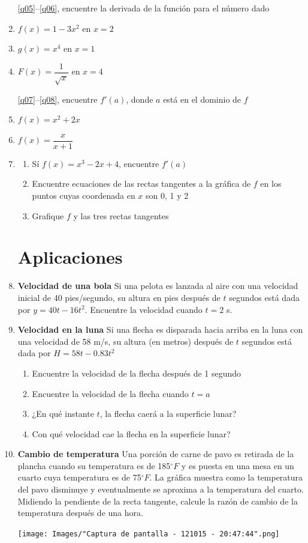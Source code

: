 \documentclass[letterpaper,twoside]{article}
\begin{document}
\begin{multicols}{2}
\begin{enumerate}
\ref{q05}--\ref{q06}, encuentre la derivada de la función para el número dado
\item \label{q05} $f(x)=1-3x^{2}$ en $x=2$
\item $g(x)=x^{4}$ en $x=1$
\item \label{q06} $F(x)=\dfrac{1}{\sqrt{x}}$ en $x=4$

\ref{q07}--\ref{q08}, encuentre $f'(a)$, donde $a$ está en el dominio de $f$
\item \label{q07} $f(x)=x^{2}+2x$
\item $f(x)=\dfrac{x}{x+1}$
\item \label{q08} \begin{enumerate}
\item Sí $f(x)=x^{3}-2x+4$, encuentre $f'(a)$
\item Encuentre ecuaciones de las rectas tangentes a la gráfica de $f$ en los puntos cuyas coordenada en $x$ son 0, 1 y 2
\item Grafique $f$ y las tres rectas tangentes
\end{enumerate}
\section*{Aplicaciones}
\item \textbf{Velocidad de una bola} Si una pelota es lanzada al aire con una velocidad inicial de 40 pies/segundo, su altura en pies después de $t$ segundos está dada por $y=40t-16t^{2}$. Encuentre la velocidad cuando $t=2$ s.
\item \textbf{Velocidad en la luna} Si una flecha es disparada hacia arriba en la luna con una velocidad de 58 m/s, su altura (en metros) después de $t$ segundos está dada por $H=58t-0.83t^{2}$
\begin{enumerate}
\item Encuentre la velocidad de la flecha después de 1 segundo
\item Encuentre la velocidad de la flecha cuando $t=a$
\item ¿En qué instante $t$, la flecha caerá a la superficie lunar?
\item Con qué velocidad cae la flecha en la superficie lunar?
\end{enumerate}
\item \textbf{Cambio de temperatura} Una porción de carne de pavo es retirada de la plancha cuando su temperatura es de 185$^{\circ}F$ y es puesta en una mesa en un cuarto cuya temperatura es de 75$^{\circ}F$. La gráfica muestra como la temperatura del pavo disminuye y eventualmente se aproxima a la temperatura del cuarto. Midiendo la pendiente de la recta tangente, calcule la razón de cambio de la temperatura después de una hora.
\begin{center}
\texttt{[image: Images/"Captura de pantalla - 121015 - 20:47:44".png]} 
\end{center}
\end{enumerate}

\end{multicols}
\end{document}
